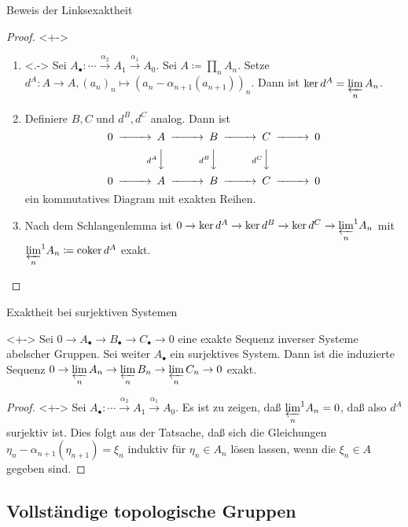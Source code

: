 \begin{frame}{Beweis der Linksexaktheit}
	\begin{proof}<+->
		\begin{enumerate}[<+->]
		\item<.->
			Sei \(A_\bullet\colon \dotsb \xrightarrow{\alpha_2} A_1 \xrightarrow{\alpha_1} A_0\).
			Sei \(A \coloneqq \prod\limits_n A_n\). Setze \(d^A\colon A \to A, (a_n)_n \mapsto
			(a_n - \alpha_{n + 1}(a_{n + 1}))_n\). Dann ist \(\ker d^A = \varprojlim\limits_n A_n\).
		\item
			Definiere \(B, C\) und \(d^B, d^C\) analog. Dann ist
			\[
				\begin{CD}
					0 @>>> A @>>> B @>>> C @>>> 0 \\
					& & @V{d^A}VV @V{d^B}VV @V{d^C}VV \\
					0 @>>> A @>>> B @>>> C @>>> 0
				\end{CD}
			\]
			ein kommutatives Diagram mit exakten Reihen.
		\item
			Nach dem Schlangenlemma ist \(0 \to \ker d^A \to \ker d^B \to \ker d^C \to {\varprojlim\limits_n}^1 A_n\)
			mit \({\varprojlim\limits_n}^1 A_n \coloneqq \operatorname{coker} d^A\) exakt.
			\qedhere
		\end{enumerate}
	\end{proof}
\end{frame}

\begin{frame}{Exaktheit bei surjektiven Systemen}
	\begin{proposition}<+->
		Sei \(0 \to A_\bullet \to B_\bullet \to C_\bullet \to 0\) eine exakte Sequenz inverser Systeme abelscher Gruppen. 
		Sei weiter \(A_\bullet\) ein surjektives System.
		Dann
		ist die induzierte Sequenz \(0 \to \varprojlim\limits_n A_n \to \varprojlim\limits_n B_n \to \varprojlim\limits_n C_n \to 0\)
		exakt.
	\end{proposition}
	\begin{proof}<+->
		Sei \(A_\bullet\colon \dotsb \xrightarrow{\alpha_2} A_1 \xrightarrow{\alpha_1} A_0\).
		Es ist zu zeigen, daß \({\varprojlim\limits_n}^1 A_n = 0\), daß also \(d^A\) surjektiv ist. Dies folgt aus der Tatsache,
		daß sich die Gleichungen \(\eta_n - \alpha_{n + 1}(\eta_{n + 1}) = \xi_n\) induktiv für \(\eta_n \in A_n\) lösen lassen, wenn
		die \(\xi_n \in A\) gegeben sind.
	\end{proof}
\end{frame}

\subsection{Vollständige topologische Gruppen}

